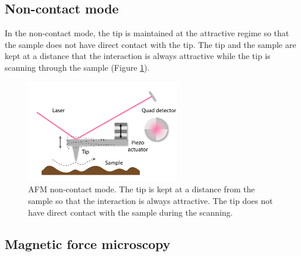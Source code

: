 \documentclass[pdflatex, sectionletters, 12pt, final, phd]{pittetd}    %
\begin{document}
\subsection{Non-contact mode}

In the non-contact mode, the tip is maintained at the attractive regime so that the sample does not have direct contact with the tip. The tip and the sample are kept at a distance that the interaction is always attractive while the tip is scanning through the sample (Figure \ref{FIG:NonContactAFM}). 

\begin{figure}[h!]
	\centering
	\includegraphics[width=0.6\textwidth]{Drawing/NonContactAFM.pdf}
	\caption[AFM non-contact mode]{AFM non-contact mode. The tip is kept at a distance from the sample so that the interaction is always attractive. The tip does not have direct contact with the sample during the scanning.}
	\label{FIG:NonContactAFM}
\end{figure}

\subsection{Magnetic force microscopy}
\label{SEC:AFMMFM}
\end{document}
